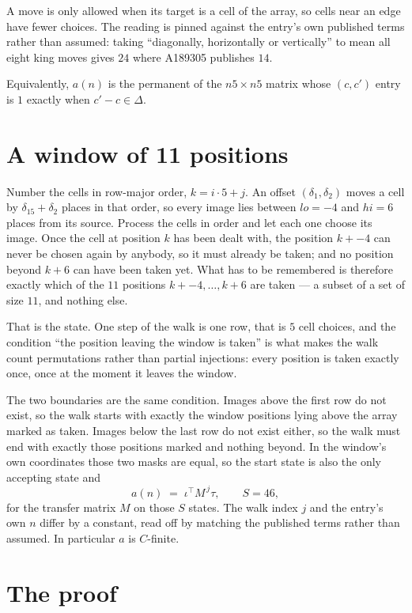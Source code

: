 \documentclass[11pt,a4paper]{article}
\theoremstyle{plain}
\theoremstyle{definition}
\begin{document}
A move is only allowed when its target is a cell of the array, so cells near an
edge have fewer choices. The reading is pinned against the entry's own published terms rather
than assumed: taking ``diagonally, horizontally or vertically'' to mean all eight king moves
gives $24$ where A189305 publishes $14$.

Equivalently, $a(n)$ is the permanent of the $n5\times n5$ matrix whose $(c,c')$ entry is
$1$ exactly when $c'-c\in\Delta$.

\section{A window of 11 positions}

Number the cells in row-major order, $k=i\cdot5+j$. An offset $(\delta_1,\delta_2)$ moves a
cell by $\delta_15+\delta_2$ places in that order, so every image lies between $lo=-4$ and
$hi=6$ places from its source. Process the cells in order and let each one choose its image.
Once the cell at position $k$ has been dealt with, the position $k+-4$ can never be chosen
again by anybody, so it must already be taken; and no position beyond $k+6$ can have been
taken yet. What has to be remembered is therefore exactly which of the $11$ positions
$k+-4,\dots,k+6$ are taken --- a subset of a set of size $11$, and nothing else.

That is the state. One step of the walk is one row, that is $5$ cell choices, and the
condition ``the position leaving the window is taken'' is what makes the walk count permutations
rather than partial injections: every position is taken exactly once, once at the moment it
leaves the window.

The two boundaries are the same condition. Images above the first row do not exist, so the walk
starts with exactly the window positions lying above the array marked as taken. Images below the
last row do not exist either, so the walk must end with exactly those positions marked and
nothing beyond. In the window's own coordinates those two masks are equal, so the start state is
also the only accepting state and
\[
a(n)\;=\;\iota^{\!\top}M^{\,j}\tau ,\qquad S=46,
\]
for the transfer matrix $M$ on those $S$ states. The walk index $j$ and the entry's own $n$
differ by a constant, read off by matching the published terms rather than assumed. In
particular $a$ is $C$-finite.

\section{The proof}
\end{document}
